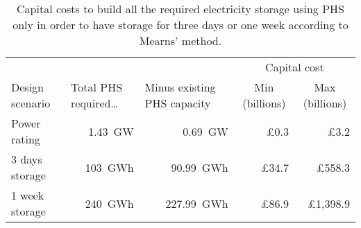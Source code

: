 \begin{table}[htbp]
	\caption{Capital costs to build all the required electricity storage using PHS only in order to have storage for three days or one week according to Mearns' method.}
	\label{tbl:costs_calc}
	\centering
	\begin{tabular}{@{}lrrrr@{}}
		\toprule
		& \multicolumn{1}{l}{} & \multicolumn{1}{l}{} & \multicolumn{2}{c}{Capital cost} \\
		\multirow{-2}{*}{Design scenario} & \multicolumn{1}{l}{\multirow{-2}{*}{Total PHS required\ldots}} & \multicolumn{1}{l}{\multirow{-2}{*}{Minus existing PHS capacity}} & \multicolumn{1}{c}{Min (billions)} & \multicolumn{1}{c}{Max (billions)} \\ \midrule
		Power rating & 1.43~GW & 0.69~GW & £0.3 & £3.2 \\
		3 days storage & 103~GWh & 90.99~GWh & £34.7 & £558.3 \\
		1 week storage & 240~GWh & 227.99~GWh & £86.9 & £1,398.9 \\ \bottomrule
	\end{tabular}
\end{table}